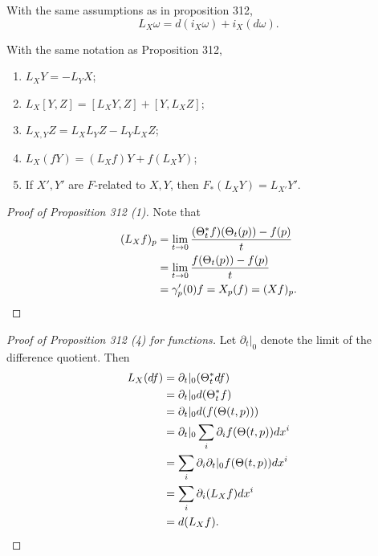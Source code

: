 \documentclass[twoside, 10pt]{article}
\begin{document}
    \begin{thm} With the same assumptions as in proposition
        312, \[L_X \omega = d(i_X \omega) + i_X(d\omega).\] \end{thm}

    \begin{cor} With the same notation as Proposition 312,
        \begin{enumerate}[label=(\alph*)] \item $L_X Y = - L_Y X$; \item
            $L_X[Y,Z] = [L_X Y, Z] + [Y, L_X Z]$; \item $L_{X,Y} Z = L_X L_Y Z
            - L_Y L_X Z$; \item $L_X(fY) = (L_X f)Y + f(L_X Y)$; \item If $X',
    Y'$ are $F$-related to $X,Y$, then $F_*(L_X Y) = L_{X'}Y'$.
    \end{enumerate} \end{cor}

    \begin{proof}[Proof of Proposition 312 (1)] Note that \begin{align*} (L_X
        f)_p &= \lim_{t \to 0} \frac{(\Theta_t^* f)(\Theta_t(p)) - f(p)}{t} \\
             &= \lim_{t \to 0} \frac{f(\Theta_t(p)) - f(p)}{t} \\ &=
             \gamma_p'(0) f = X_p(f) = (Xf)_p. \qedhere \end{align*}
         \end{proof}

    \begin{proof}[Proof of Proposition 312 (4) for functions] Let $\partial_t
        |_0$ denote the limit of the difference quotient. Then \begin{align*}
            L_X(df) &= \partial_t |_0 (\Theta_t^* df) \\ &= \partial_t |_0
            d(\Theta_t^* f) \\ &= \partial_t |_0 d(f(\Theta(t,p))) \\ &=
            \partial_t |_0 \sum_i \partial_i f(\Theta(t,p)) dx^i \\ &= \sum_i
            \partial_i \partial_t |_0 f(\Theta(t,p)) dx^i \\ &= \sum_i
            \partial_i(L_X f) dx^i \\ &= d(L_X f). \qedhere \end{align*}
        \end{proof}
\end{document}
